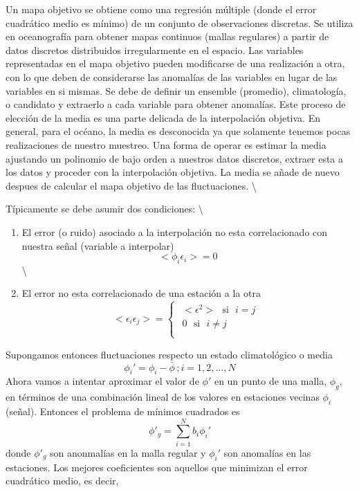 \documentclass[
]{agujournal2019}
\providecommand{\tightlist}{%
  \setlength{\itemsep}{0pt}\setlength{\parskip}{0pt}}\usepackage{longtable,booktabs,array}
\begin{document}
Un mapa objetivo se obtiene como una regresión múltiple (donde el error
cuadrático medio es mínimo) de un conjunto de observaciones discretas.
Se utiliza en oceanografía para obtener mapas continuos (mallas
regulares) a partir de datos discretos distribuidos irregularmente en el
espacio. Las variables representadas en el mapa objetivo pueden
modificarse de una realización a otra, con lo que deben de considerarse
las anomalías de las variables en lugar de las variables en si mismas.
Se debe de definir un ensemble (promedio), climatología, o candidato y
extraerlo a cada variable para obtener anomalías. Este proceso de
elección de la media es una parte delicada de la interpolación objetiva.
En general, para el océano, la media es desconocida ya que solamente
tenemos pocas realizaciones de nuestro muestreo. Una forma de operar es
estimar la media ajustando un polinomio de bajo orden a nuestros datos
discretos, extraer esta a los datos y proceder con la interpolación
objetiva. La media se añade de nuevo despues de calcular el mapa
objetivo de las fluctuaciones. \textbackslash{}

Típicamente se debe asumir dos condiciones: \textbackslash{}

\begin{enumerate}
\def\labelenumi{(\arabic{enumi})}
\tightlist
\item
  El error (o ruido) asociado a la interpolación no esta correlacionado
  con nuestra señal (variable a interpolar) \[<\phi_i\epsilon_i>=0\]
  \textbackslash{}
\item
  El error no esta correlacionado de una estación a la otra
  \[<\epsilon_i \epsilon_j>=
  \begin{cases}
  \begin{array}{c}
     <\epsilon^2> \,\,\,\,\text{si} \,\,\,\,i=j\\
     0    \,\,\,\,        \text{si} \,\,\,\,i\ne j\\
  \end{array}
  \end{cases}\]
\end{enumerate}

Supongamos entonces fluctuaciones respecto un estado climatológico o
media \[\phi_i'=\phi_i-\bar{\phi}\,; i=1,2,...,N\] Ahora vamos a
intentar aproximar el valor de \(\phi'\) en un punto de una malla,
\(\phi_g\), en términos de una combinación lineal de los valores en
estaciones vecinas \(\phi_i\) (señal). Entonces el problema de mínimos
cuadrados es \[\phi'_g=\sum\limits^N_{i=1}b_i\phi_i'\] donde \(\phi'_g\)
son anonmalías en la malla regular y \(\phi_i'\) son anomalías en las
estaciones. Los mejores coeficientes son aquellos que minimizan el error
cuadrático medio, es decir,
\end{document}
